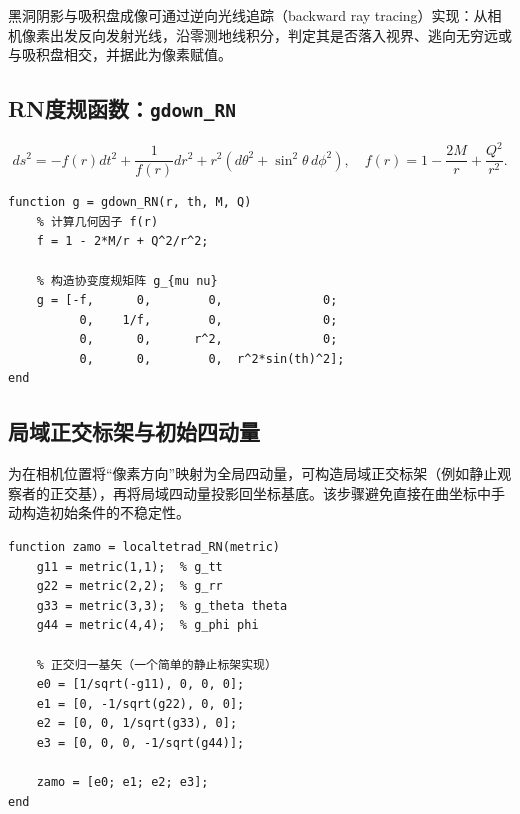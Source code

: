 \documentclass[a4paper,12pt]{article}
\numberwithin{equation}{section}
\begin{document}
黑洞阴影与吸积盘成像可通过逆向光线追踪（backward ray tracing）实现：从相机像素出发反向发射光线，沿零测地线积分，判定其是否落入视界、逃向无穷远或与吸积盘相交，并据此为像素赋值。

\subsection{RN度规函数：\texttt{gdown\_RN}}

\begin{equation}
ds^2=-f(r)dt^2+\frac{1}{f(r)}dr^2+r^2(d\theta^2+\sin^2\theta\,d\phi^2),
\quad
f(r)=1-\frac{2M}{r}+\frac{Q^2}{r^2}.
\end{equation}

\begin{lstlisting}[caption={协变度规函数 \texttt{gdown\_RN}}]
function g = gdown_RN(r, th, M, Q)
    % 计算几何因子 f(r)
    f = 1 - 2*M/r + Q^2/r^2;

    % 构造协变度规矩阵 g_{mu nu}
    g = [-f,      0,        0,              0;
          0,    1/f,        0,              0;
          0,      0,      r^2,              0;
          0,      0,        0,  r^2*sin(th)^2];
end
\end{lstlisting}

\subsection{局域正交标架与初始四动量}

为在相机位置将“像素方向”映射为全局四动量，可构造局域正交标架（例如静止观察者的正交基），再将局域四动量投影回坐标基底。该步骤避免直接在曲坐标中手动构造初始条件的不稳定性。

\begin{lstlisting}[caption={局域正交标架 \texttt{localtetrad\_RN}}]
function zamo = localtetrad_RN(metric)
    g11 = metric(1,1);  % g_tt
    g22 = metric(2,2);  % g_rr
    g33 = metric(3,3);  % g_theta theta
    g44 = metric(4,4);  % g_phi phi

    % 正交归一基矢（一个简单的静止标架实现）
    e0 = [1/sqrt(-g11), 0, 0, 0];
    e1 = [0, -1/sqrt(g22), 0, 0];
    e2 = [0, 0, 1/sqrt(g33), 0];
    e3 = [0, 0, 0, -1/sqrt(g44)];

    zamo = [e0; e1; e2; e3];
end
\end{lstlisting}
\end{document}
